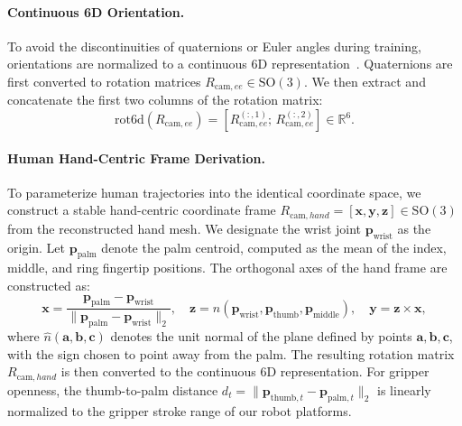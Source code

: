 \documentclass{llmxive}
\begin{document}
\paragraph{Continuous 6D Orientation.}
To avoid the discontinuities of quaternions or Euler angles during training, orientations are normalized to a continuous 6D representation~\cite{zhou2019continuity}. Quaternions are first converted to rotation matrices $R_{\mathrm{cam},ee} \in \mathrm{SO}(3)$. We then extract and concatenate the first two columns of the rotation matrix:
\begin{equation}
    \mathrm{rot6d}(R_{\mathrm{cam},ee})
    =
    \left[
    R_{\mathrm{cam},ee}^{(:,1)};\,
    R_{\mathrm{cam},ee}^{(:,2)}
    \right] \in \mathbb{R}^6.
\end{equation}

\paragraph{Human Hand-Centric Frame Derivation.}
To parameterize human trajectories into the identical coordinate space, we construct a stable hand-centric coordinate frame $R_{\mathrm{cam}, hand} = [\mathbf{x}, \mathbf{y}, \mathbf{z}] \in \mathrm{SO}(3)$ from the reconstructed hand mesh. We designate the wrist joint $\mathbf{p}_{\mathrm{wrist}}$ as the origin. Let $\mathbf{p}_{\mathrm{palm}}$ denote the palm centroid, computed as the mean of the index, middle, and ring fingertip positions. The orthogonal axes of the hand frame are constructed as:
\begin{equation}
  \mathbf{x} = \frac{\mathbf{p}_{\mathrm{palm}} - \mathbf{p}_{\mathrm{wrist}}}{\|\mathbf{p}_{\mathrm{palm}} - \mathbf{p}_{\mathrm{wrist}}\|_2},
  \quad
  \mathbf{z} = \hat{n}(\mathbf{p}_{\mathrm{wrist}}, \mathbf{p}_{\mathrm{thumb}}, \mathbf{p}_{\mathrm{middle}}),
  \quad
  \mathbf{y} = \mathbf{z} \times \mathbf{x},
\end{equation}
where $\hat{n}(\mathbf{a},\mathbf{b},\mathbf{c})$ denotes the unit normal of the plane defined by points $\mathbf{a},\mathbf{b},\mathbf{c}$, with the sign chosen to point away from the palm. The resulting rotation matrix $R_{\mathrm{cam}, hand}$ is then converted to the continuous 6D representation. For gripper openness, the thumb-to-palm distance $d_t = \|\mathbf{p}_{\mathrm{thumb},t} - \mathbf{p}_{\mathrm{palm},t}\|_2$ is linearly normalized to the gripper stroke range of our robot platforms.
\end{document}
